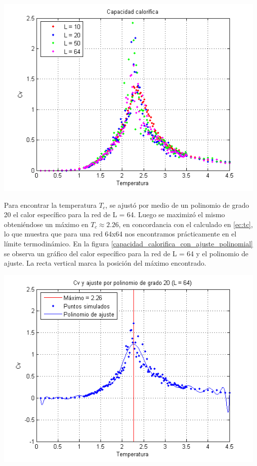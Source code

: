 \documentclass[twocolumn,Spanish,a4paper,11pt]{article}
\begin{document}
\begin{minipage}{0.45\textwidth}									
\centering
\includegraphics[totalheight=0.25\textheight]{figuras/capacidad_calorifica.png}
\label{grafico_capacidad_calorifica}
\end{minipage}

Para encontrar la temperatura $T_c$, se ajustó por medio de un polinomio de grado 20 el calor específico para la red de L = 64. Luego se maximizó el mismo obteniéndose un máximo en $T_c\approx2.26$, en concordancia con el calculado en \ref{ec:tc}, lo que muestra que para una red 64x64 nos encontramos prácticamente en el límite termodinámico. 
En la figura \ref{capacidad_calorifica_con_ajuste_polinomial} se observa un gráfico del calor específico para la red de L = 64 y el polinomio de ajuste. La recta vertical marca la posición del máximo encontrado.

\begin{minipage}{0.45\textwidth}									
\centering
\includegraphics[totalheight=0.25\textheight]{figuras/capacidad_calorifica_con_ajuste_polinomial.png}
\label{capacidad_calorifica_con_ajuste_polinomial}
\end{minipage}
\end{document}
